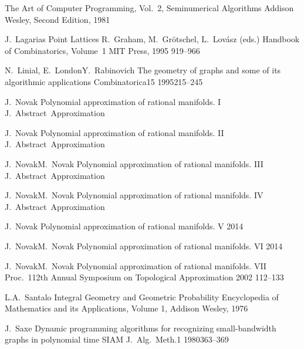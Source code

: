 \documentclass[12pt,a4paper,titlepage,openany]{report}
\begin{document}
\begin{thebibliography}{99}
   {The Art of Computer Programming, Vol.~2, Seminumerical Algorithms}
    {Addison Wesley, Second Edition, 1981}

\bookChapterOneAuthor
   {J.~Lagarias}
   {Point Lattices}
   {R.~Graham, M.~Gr\"otschel, L.~Lov\'asz (eds.)}
   {Handbook of Combinatorics, Volume~1}
   {MIT Press, 1995}
   {919--966}

   \articleInJournalManyAuthors
     {N.~Linial, E.~London}{Y.~Rabinovich}
   {The geometry of graphs and some of its algorithmic applications}
     {Combinatorica}{15}
     {1995}{215--245}

   \articleInJournalOneAuthorAccepted
     {J.~Novak}
   {Polynomial approximation of rational manifolds. I}
     {J.~Abstract~Approximation}

   \articleInJournalOneAuthorInPrint
     {J.~Novak}
   {Polynomial approximation of rational manifolds. II}
     {J.~Abstract~Approximation}

   \articleInJournalTwoAuthorsAccepted
     {J.~Novak}{M.~Novak}
   {Polynomial approximation of rational manifolds. III}
     {J.~Abstract~Approximation}

   \articleInJournalTwoAuthorsInPrint
     {J.~Novak}{M.~Novak}
   {Polynomial approximation of rational manifolds. IV}
     {J.~Abstract~Approximation}

   \articleInJournalOneAuthorSubmitted
     {J.~Novak}
   {Polynomial approximation of rational manifolds. V}
     {2014}

   \articleInJournalTwoAuthorsSubmitted
     {J.~Novak}{M.~Novak}
   {Polynomial approximation of rational manifolds. VI}
     {2014}

\conferenceArticleTwoAuthors
     {J.~Novak}{M.~Novak}
   {Polynomial approximation of rational manifolds. VII}
    {Proc.~112th Annual Symposium on Topological Approximation}
    {2002}
    {112--133}

  \bookOneAuthor
  {L.A.~Santalo}
   {Integral Geometry and Geometric Probability}
    {Encyclopedia of Mathematics and its Applications, Volume 1, Addison Wesley, 1976}

   \articleInJournalOneAuthor
     {J.~Saxe}
   {Dynamic programming algorithms for recognizing small-bandwidth graphs in polynomial time}
     {SIAM J.~Alg.~Meth.}{1}
     {1980}{363--369}


\end{thebibliography}
\end{document}
